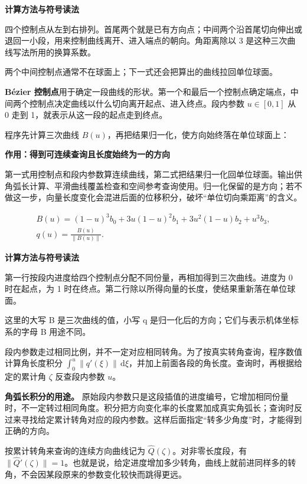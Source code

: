 \documentclass[12pt,a4paper]{article}
\numberwithin{equation}{topic}
\begin{document}
\noindent\textbf{计算方法与符号读法}\par\nobreak
四个控制点从左到右排列。首尾两个就是已有方向点；中间两个沿首尾切向伸出或退回一小段，用来控制曲线离开、进入端点的朝向。角距离除以 3 是这种三次曲线写法所用的换算系数。

两个中间控制点通常不在球面上；下一式还会把算出的曲线拉回单位球面。


\textbf{Bézier 控制点}用于确定一段曲线的形状。第一个和最后一个控制点确定端点，中间两个控制点决定曲线以什么切向离开起点、进入终点。段内参数 \(u\in[0,1]\) 从 0 走到 1，就表示从这一段的起点走到终点。

程序先计算三次曲线 \(B(u)\)，再把结果归一化，使方向始终落在单位球面上：

\noindent\textbf{作用：得到可连续查询且长度始终为一的方向}\par\nobreak
第一式用控制点和段内参数算连续曲线，第二式把结果归一化回单位球面。输出供角弧长计算、平滑曲线覆盖检查和空间参考查询使用。归一化保留的是方向；若不做这一步，向量长度变化会混进后面的位移积分，破坏“单位切向乘距离”的含义。

\begin{equation}
\label{eq:normalize}
\begin{gathered}
B(u)=(1-u)^3 b_0+3u(1-u)^2b_1+3u^2(1-u)b_2+u^3b_3,
\\
q(u)=\frac{B(u)}{\|B(u)\|}.
\end{gathered}
\end{equation}

\noindent\textbf{计算方法与符号读法}\par\nobreak
第一行按段内进度给四个控制点分配不同份量，再相加得到三次曲线。进度为 0 时在起点，为 1 时在终点。第二行除以所得向量的长度，使结果重新落在单位球面。

这里的大写 B 是三次曲线的值，小写 q 是归一化后的方向；它们与表示机体坐标系的字母 B 用途不同。


段内参数走过相同比例，并不一定对应相同转角。为了按真实转角查询，程序数值计算角长度积分 \(\int_0^u\|q'(\xi)\|\,\mathrm d\xi\)，并加上前面各段的角长度。查询时，再根据给定的累计角 \(\zeta\) 反查段内参数 \(u\)。

\textbf{角弧长积分的用途。} 原始段内参数只是这段插值的进度编号，它增加相同份量时，不一定转过相同角度。积分把方向变化率的长度累加成真实角弧长；查询时反过来寻找给定累计转角对应的段内参数。这样后面指定“转多少角度”时，才能得到正确的方向。

按累计转角来查询的连续方向曲线记为 \(\widehat Q(\zeta)\)。对非零长度段，有 \(\|\widehat Q'(\zeta)\|=1\)。也就是说，给定进度增加多少转角，曲线上就前进同样多的转角，不会因某段原来的参数变化较快而跳得更远。
\end{document}
